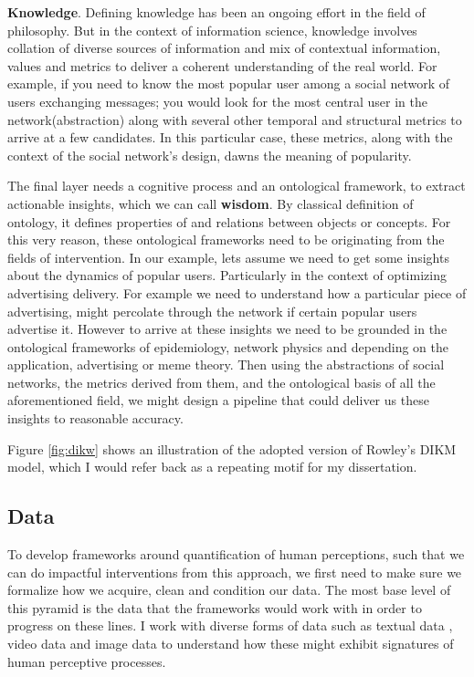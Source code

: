 \textbf{Knowledge}. Defining knowledge has been an ongoing effort in the field of philosophy. But in the context of information science, knowledge involves collation of diverse sources of information and  mix of contextual information, values and metrics to deliver a coherent understanding of the real world. For example, if you need to know the most popular user among a social network of users exchanging messages; you would look for the most central user in the network(abstraction) along with several other temporal and structural metrics to arrive at a few candidates. In this particular case, these metrics, along with the context of the social network's design, dawns the meaning of popularity. 

The final layer needs a cognitive process and an ontological framework, to extract actionable insights, which we can call \textbf{wisdom}. By classical definition of ontology, it defines properties of and relations between objects or concepts. For this very reason, these ontological frameworks need to be originating from the fields of intervention.  In our example, lets assume we need to get some insights about the dynamics of popular users. Particularly in the context of optimizing advertising delivery. For example we need to understand how a particular piece of advertising, might percolate through the network if certain popular users advertise it. However to arrive at these insights we need to be grounded in the ontological frameworks of epidemiology, network physics and depending on the application, advertising or meme theory. Then using the abstractions of social networks, the metrics derived from them, and the ontological basis of all the aforementioned field, we might design a pipeline that could deliver us these insights to reasonable accuracy. 

Figure \ref{fig:dikw} shows an illustration of the adopted version of Rowley's DIKM model, which I would refer back as a repeating motif for my dissertation.

\subsection{Data}
To develop frameworks around quantification of human perceptions, such that we can do impactful interventions from this approach, we first need to make sure we formalize how we acquire, clean and condition our data. The most base level of this pyramid is the data that the frameworks would work with in order to progress on these lines. I work with diverse forms of data such as textual data , video data and image data to understand how these might exhibit signatures of human perceptive processes. 

